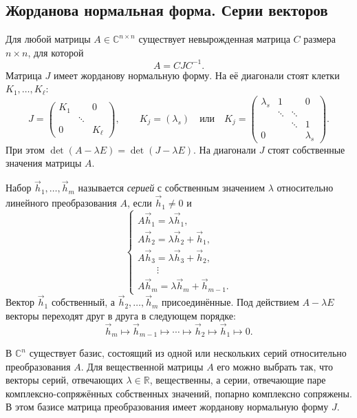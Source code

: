 \documentclass[12pt,a4paper]{article}
\numberwithin{equation}{section}
\newcommand{\R}{\mathbb{R}}
\newcommand{\vect}[1]{\vec{#1}}
\begin{document}
\subsection{Жорданова нормальная форма. Серии векторов}

Для любой матрицы $A\in\mathbb C^{n\times n}$ существует
невырожденная матрица $C$ размера $n\times n$, для которой
\[
 A=CJC^{-1}.
\]
Матрица $J$ имеет жорданову нормальную форму. На её диагонали стоят
клетки $K_1,\ldots,K_\ell$:
\[
 J=\begin{pmatrix}
    K_1 &        & 0\\
        & \ddots &  \\
    0   &        & K_\ell
   \end{pmatrix},
 \qquad K_j=(\lambda_s)
 \quad\text{или}\quad
 K_j=\begin{pmatrix}
   \lambda_s&1&&0\\
            &\ddots&\ddots&\\
            &&\ddots&1\\
   0&&&\lambda_s
 \end{pmatrix}.
\]
При этом $\det(A-\lambda E)=\det(J-\lambda E)$.
На диагонали $J$ стоят собственные значения матрицы $A$.

\begin{definitionHSE}
Набор $\vect h_1,\ldots,\vect h_m$ называется \textit{серией}
с собственным значением $\lambda$ относительно линейного преобразования $A$,
если $\vect h_1\ne0$ и
\[
 \begin{cases}
 A\vect h_1=\lambda\vect h_1,\\
 A\vect h_2=\lambda\vect h_2+\vect h_1,\\
 A\vect h_3=\lambda\vect h_3+\vect h_2,\\
 \hspace{2em}\vdots\\
 A\vect h_m=\lambda\vect h_m+\vect h_{m-1}.
 \end{cases}
\]
Вектор $\vect h_1$ собственный, а $\vect h_2,\ldots,\vect h_m$ присоединённые.
Под действием $A-\lambda E$ векторы переходят друг в друга в следующем порядке:
\[
 \vect h_m\longmapsto\vect h_{m-1}\longmapsto\cdots
 \longmapsto\vect h_2\longmapsto\vect h_1\longmapsto0.
\]
\end{definitionHSE}

\begin{theoremHSE}
В $\mathbb C^n$ существует базис, состоящий из одной или нескольких серий
относительно преобразования $A$. Для вещественной матрицы $A$ его можно
выбрать так, что векторы серий, отвечающих $\lambda\in\R$, вещественны,
а серии, отвечающие паре комплексно-сопряжённых собственных значений,
попарно комплексно сопряжены. В этом базисе матрица преобразования
имеет жорданову нормальную форму $J$.
\end{theoremHSE}
\end{document}
